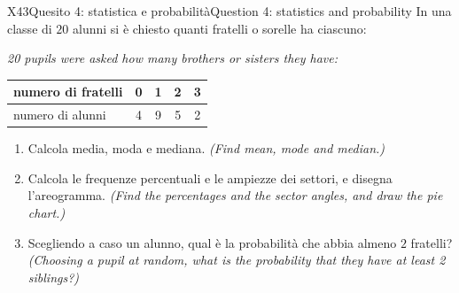 \documentclass[11pt,a4paper]{article}
\newcommand{\en}[1]{\par{\small\itshape\color{engray}#1\par}}
\newcommand{\enx}[1]{{\small\itshape\color{engray}(#1)}}
\begin{document}
\begin{esercizio}{X4}{3}{Quesito 4: statistica e probabilità}{Question 4: statistics and probability}
In una classe di $20$ alunni si è chiesto quanti fratelli o sorelle ha ciascuno:
\en{20 pupils were asked how many brothers or sisters they have:}
\begin{center}
\begin{tabular}{l|cccc}
numero di fratelli & 0 & 1 & 2 & 3\\ \hline
numero di alunni & 4 & 9 & 5 & 2
\end{tabular}
\end{center}
\begin{enumerate}
\item Calcola media, moda e mediana. \enx{Find mean, mode and median.}
\item Calcola le frequenze percentuali e le ampiezze dei settori, e disegna l'areogramma. \enx{Find the percentages and the sector angles, and draw the pie chart.}
\item Scegliendo a caso un alunno, qual è la probabilità che abbia almeno $2$ fratelli? \enx{Choosing a pupil at random, what is the probability that they have at least 2 siblings?}
\end{enumerate}
\end{esercizio}
\end{document}
